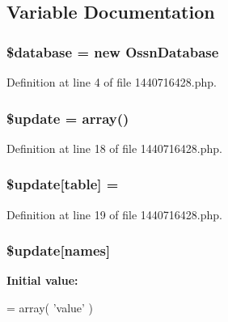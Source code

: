 \subsection{Variable Documentation}
\subsubsection[{\texorpdfstring{\$database}{$database}}]{\setlength{\rightskip}{0pt plus 5cm}\${\bf database} = new {\bf Ossn\+Database}}\hypertarget{1440716428_8php_a7691c0162d89de0b6ba47edcd8ba8878}{}\label{1440716428_8php_a7691c0162d89de0b6ba47edcd8ba8878}


Definition at line 4 of file 1440716428.\+php.

\subsubsection[{\texorpdfstring{\$update}{$update}}]{\setlength{\rightskip}{0pt plus 5cm}\${\bf update} = array()}\hypertarget{1440716428_8php_a13a7db07df65d01cfbca768f443084cc}{}\label{1440716428_8php_a13a7db07df65d01cfbca768f443084cc}


Definition at line 18 of file 1440716428.\+php.

\subsubsection[{\texorpdfstring{\$update}{$update}}]{\setlength{\rightskip}{0pt plus 5cm}\${\bf update}\mbox{[}\textquotesingle{}table\textquotesingle{}\mbox{]} = \textquotesingle{}}\hypertarget{1440716428_8php_aee7ba5985ddf023a93862ab77e9718f9}{}\label{1440716428_8php_aee7ba5985ddf023a93862ab77e9718f9}


Definition at line 19 of file 1440716428.\+php.

\subsubsection[{\texorpdfstring{\$update}{$update}}]{\setlength{\rightskip}{0pt plus 5cm}\${\bf update}\mbox{[}\textquotesingle{}names\textquotesingle{}\mbox{]}}\hypertarget{1440716428_8php_abcf5ad2e4fef35de04bef0168cc91ddc}{}\label{1440716428_8php_abcf5ad2e4fef35de04bef0168cc91ddc}
{\bfseries Initial value\+:}
\begin{DoxyCode}
= array(
        \textcolor{stringliteral}{'value'}
)
\end{DoxyCode}


